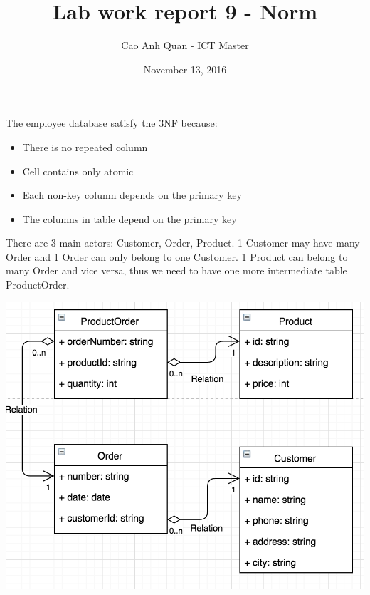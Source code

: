 \documentclass[12pt]{article}
\title{Lab work report 9 - Norm}
\author{Cao Anh Quan - ICT Master}
\date{November 13, 2016}
\begin{document}
 
\begin{titlepage}
\maketitle
\end{titlepage}

The employee database satisfy the 3NF because:

\begin{itemize}
\item There is no repeated column
\item Cell contains only atomic
\item Each non-key column depends on the primary key
\item The columns in table depend on the primary key
\end{itemize}

There are 3 main actors: Customer, Order, Product. 1 Customer may have many Order and 1 Order can only belong to one Customer. 1 Product can belong to many Order and vice versa, thus we need to have one more intermediate table ProductOrder.

\includegraphics[width=\textwidth]{order.png}

 
\end{document}

